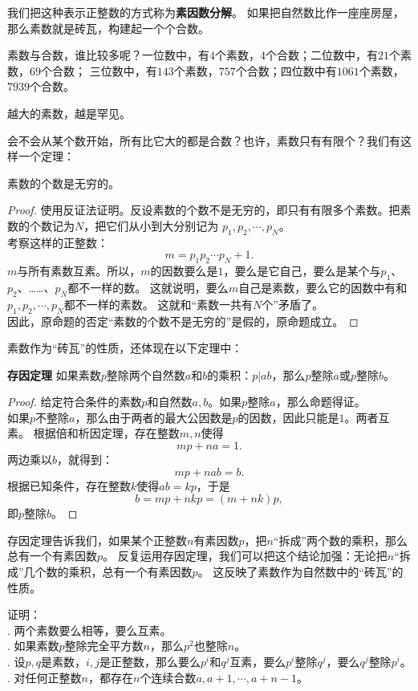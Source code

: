 \documentclass[12pt,UTF8,fontset=none]{ctexbook}
\begin{document}
我们把这种表示正整数的方式称为\textbf{素因数分解}。
如果把自然数比作一座座房屋，那么素数就是砖瓦，构建起一个个合数。

素数与合数，谁比较多呢？一位数中，有$4$个素数，$4$个合数；二位数中，有$21$个素数，$69$个合数；
三位数中，有$143$个素数，$757$个合数；四位数中有$1061$个素数，$7939$个合数。

越大的素数，越是罕见。

会不会从某个数开始，所有比它大的都是合数？也许，素数只有有限个？我们有这样一个定理：

\begin{tm}\label{tm:1-0-10}
    素数的个数是无穷的。
\end{tm}
\begin{proof}
    使用反证法证明。反设素数的个数不是无穷的，即只有有限多个素数。把素数的个数记为$N$，把它们从小到大分别记为
    $p_1, p_2,\cdots , p_N$。\\
    考察这样的正整数：
    $$ m = p_1p_2\cdots p_N + 1.$$
    $m$与所有素数互素。所以，$m$的因数要么是$1$，要么是它自己，要么是某个与$p_1$、$p_2$、……、$p_N$都不一样的数。
    这就说明，要么$m$自己是素数，要么它的因数中有和$p_1, p_2,\cdots , p_N$都不一样的素数。
    这就和“素数一共有$N$个”矛盾了。\\
    因此，原命题的否定“素数的个数不是无穷的”是假的，原命题成立。
\end{proof}

素数作为“砖瓦”的性质，还体现在以下定理中：
\begin{tm}{\textbf{存因定理 }}\label{tm:1-0-20}
    如果素数$p$整除两个自然数$a$和$b$的乘积：$p | ab$，那么$p$整除$a$或$p$整除$b$。
\end{tm}
\begin{proof}
    给定符合条件的素数$p$和自然数$a,b$。如果$p$整除$a$，那么命题得证。\\
    如果$p$不整除$a$，那么由于两者的最大公因数是$p$的因数，因此只能是$1$。两者互素。
    根据倍和析因定理，存在整数$m,n$使得
    $$ mp + na = 1.$$
    两边乘以$b$，就得到：
    $$ mp + nab = b. $$
    根据已知条件，存在整数$k$使得$ab = kp$，于是 
    $$ b = mp + nkp = (m + nk)p,$$
    即$p$整除$b$。
\end{proof}

存因定理告诉我们，如果某个正整数$n$有素因数$p$，把$n$“拆成”两个数的乘积，那么总有一个有素因数$p$。
反复运用存因定理，我们可以把这个结论加强：无论把$n$“拆成”几个数的乘积，总有一个有素因数$p$。
这反映了素数作为自然数中的“砖瓦”的性质。

\begin{xt}\label{xt:1-0-0}
    证明：\\
    . 两个素数要么相等，要么互素。\\
    . 如果素数$p$整除完全平方数$n$，那么$p^2$也整除$n$。\\
    . 设$p,q$是素数，$i,j$是正整数，那么要么$p^i$和$q^j$互素，要么$p^i$整除$q^j$，要么$q^j$整除$p^i$。\\
    . 对任何正整数$n$，都存在$n$个连续合数$a, a+1, \cdots , a+n-1$。
\end{xt}
\end{document}
